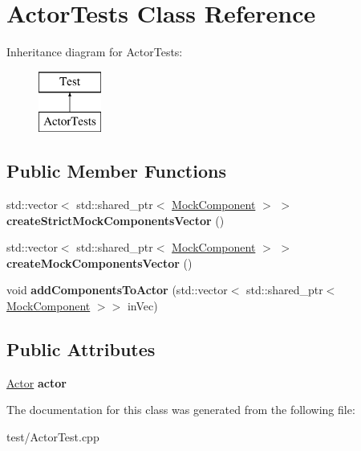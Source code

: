 \hypertarget{classActorTests}{}\section{Actor\+Tests Class Reference}
\label{classActorTests}
Inheritance diagram for Actor\+Tests\+:\begin{figure}[H]
\begin{center}
\leavevmode
\includegraphics[height=2.000000cm]{classActorTests}
\end{center}
\end{figure}
\subsection*{Public Member Functions}
\begin{DoxyCompactItemize}
\item 
std\+::vector$<$ std\+::shared\+\_\+ptr$<$ \hyperlink{classMockComponent}{Mock\+Component} $>$ $>$ {\bfseries create\+Strict\+Mock\+Components\+Vector} ()\hypertarget{classActorTests_a020b0bc3c5d4d21df25d5a2e26bc7cde}{}\label{classActorTests_a020b0bc3c5d4d21df25d5a2e26bc7cde}

\item 
std\+::vector$<$ std\+::shared\+\_\+ptr$<$ \hyperlink{classMockComponent}{Mock\+Component} $>$ $>$ {\bfseries create\+Mock\+Components\+Vector} ()\hypertarget{classActorTests_a7c3f25ceee44a4e1afd8b9a679c90e89}{}\label{classActorTests_a7c3f25ceee44a4e1afd8b9a679c90e89}

\item 
void {\bfseries add\+Components\+To\+Actor} (std\+::vector$<$ std\+::shared\+\_\+ptr$<$ \hyperlink{classMockComponent}{Mock\+Component} $>$$>$ in\+Vec)\hypertarget{classActorTests_a6faea7f33a95d348a683991b15af6fd3}{}\label{classActorTests_a6faea7f33a95d348a683991b15af6fd3}

\end{DoxyCompactItemize}
\subsection*{Public Attributes}
\begin{DoxyCompactItemize}
\item 
\hyperlink{classActor}{Actor} {\bfseries actor}\hypertarget{classActorTests_a85f068f735c773909d7779407b3db165}{}\label{classActorTests_a85f068f735c773909d7779407b3db165}

\end{DoxyCompactItemize}


The documentation for this class was generated from the following file\+:\begin{DoxyCompactItemize}
\item 
test/Actor\+Test.\+cpp\end{DoxyCompactItemize}
